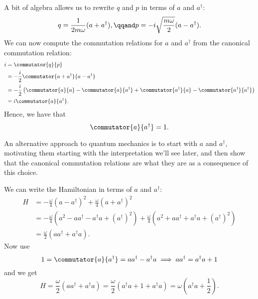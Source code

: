 \documentclass[fleqn]{NotesClass}
\newcommand{\hermit}{{\dagger}}
\begin{document}
    A bit of algebra allows us to rewrite \(q\) and \(p\) in terms of \(a\) and \(a^\hermit\):
    \begin{equation}
        q = \frac{1}{2m\omega} (a + a^\dagger), \qqand p = -i\sqrt{\frac{m\omega}{2}} (a - a^\hermit).
    \end{equation}
    We can now compute the commutation relations for \(a\) and \(a^\hermit\) from the canonical commutation relation:
    \begin{align}
        i &= \commutator{q}{p}\\
        &= -\frac{i}{2}\commutator{a + a^\hermit}{a - a^\hermit}\\
        &= -\frac{i}{2}\left( \commutator{a}{a} - \commutator{a}{a^\hermit} + \commutator{a^\hermit}{a} - \commutator{a^\hermit}{a^\hermit} \right)\\
        &= i\commutator{a}{a^\hermit}.
    \end{align}
    Hence, we have that
    \begin{equation}
        \commutator{a}{a^\hermit} = 1.
    \end{equation}
    
    An alternative approach to quantum mechanics is to start with \(a\) and \(a^\hermit\), motivating them starting with the interpretation we'll see later, and then show that the canonical commutation relations are what they are as a consequence of this choice.
    
    We can write the Hamiltonian in terms of \(a\) and \(a^\hermit\):
    \begin{align}
        H &= -\frac{\omega}{4}(a - a^\hermit)^2 + \frac{\omega}{4}(a + a^\hermit)^2\\
        &= -\frac{\omega}{4}(a^2 - aa^\hermit - a^\hermit a + (a^\hermit)^2) + \frac{\omega}{4}(a^2 + aa^\hermit + a^\hermit a + (a^\hermit)^2)\\
        &= \frac{\omega}{2}(aa^\hermit + a^\hermit a).
    \end{align}
    Now use
    \begin{equation}
        1 = \commutator{a}{a^\hermit} = aa^\hermit - a^\hermit a \implies aa^\hermit = a^\hermit a + 1
    \end{equation}
    and we get
    \begin{equation}
        H = \frac{\omega}{2}(aa^\hermit + a^\hermit a) = \frac{\omega}{2}(a^\hermit a + 1 + a^\hermit a) = \omega\left( a^\hermit a + \frac{1}{2} \right).
    \end{equation}
    
\end{document}
